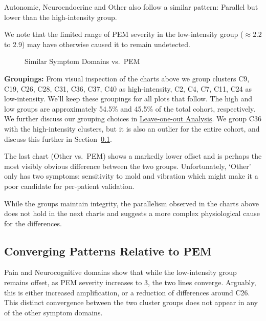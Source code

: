 \documentclass[
  letterpaper,
  DIV=11,
  numbers=noendperiod]{scrartcl}
\begin{document}
Autonomic, Neuroendocrine and Other also follow a similar pattern:
Parallel but lower than the high-intensity group.

We note that the limited range of PEM severity in the low-intensity
group (\(\approx 2.2\) to 2.9) may have otherwise caused it to remain
undetected.

\begin{figure}[h]


\caption{\label{fig-symptoms}Similar Symptom Domains vs.~PEM}

\end{figure}%

\FloatBarrier

\textbf{Groupings:} From visual inspection of the charts above we group
clusters C9, C19, C26, C28, C31, C36, C37, C40 as high-intensity, C2,
C4, C7, C11, C24 as low-intensity. We'll keep these groupings for all
plots that follow. The high and low groups are approximately 54.5\% and
45.5\% of the total cohort, respectively. We further discuss our
grouping choices in \hyperref[sec-loo]{Leave-one-out Analysis}. We group
C36 with the high-intensity clusters, but it is also an outlier for the
entire cohort, and discuss this further in Section~\ref{sec-different}.

The last chart (Other vs.~PEM) shows a markedly lower offset and is
perhaps the most visibly obvious difference between the two groups.
Unfortunately, `Other' only has two symptoms: sensitivity to mold and
vibration which might make it a poor candidate for per-patient
validation.

\FloatBarrier

While the groups maintain integrity, the parallelism observed in the
charts above does not hold in the next charts and suggests a more
complex physiological cause for the differences.

\subsection{Converging Patterns Relative to PEM}\label{sec-different}

Pain and Neurocognitive domains show that while the low-intensity group
remains offset, as PEM severity increases to 3, the two lines converge.
Arguably, this is either increased amplification, or a reduction of
differences around C26. This distinct convergence between the two
cluster groups does not appear in any of the other symptom domains.
\end{document}
